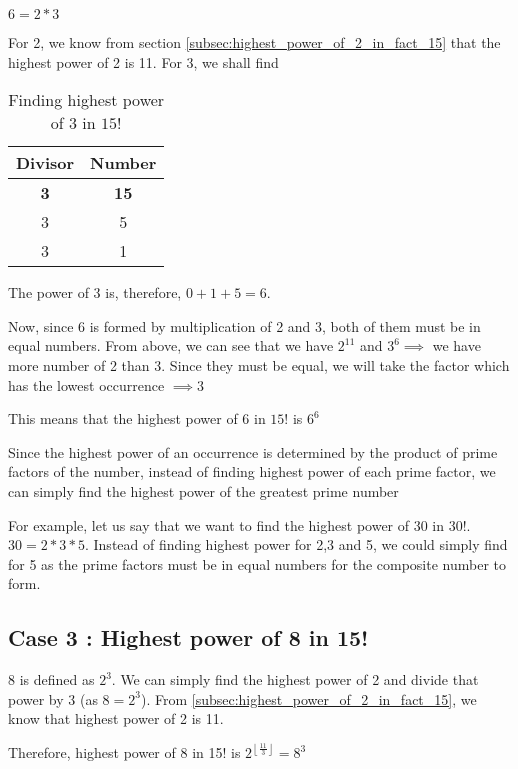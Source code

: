 $6 = 2 * 3$

For 2, we know from section \ref{subsec:highest_power_of_2_in_fact_15} that the highest power of 2 is 11. For 3, we shall find

\begin{table}[ht!]
    \centering
    \begin{tabular}{|| c | c ||}
        \hline
         Divisor & Number  \\
        \hline
         \textbf{3} & \textbf{15} \\
         3 & 5 \\
         3 & 1 \\
        \hline
    \end{tabular}
    \caption{Finding highest power of 3 in $15!$}
\end{table}

The power of 3 is, therefore, $0 + 1 + 5 = 6$.

Now, since 6 is formed by multiplication of 2 and 3, both of them must be in equal numbers. From above, we can see that we have $2^{11}$ and $3^6 \implies$ we have more number of 2 than 3. Since they must be equal, we will take the factor which has the lowest occurrence $\implies 3$

This means that the highest power of 6 in $15!$ is $6^6$

\begin{NOTE}
    Since the highest power of an occurrence is determined by the product of prime factors of the number, instead of finding highest power of each prime factor, we can simply find the highest power of the greatest prime number

    For example, let us say that we want to find the highest power of $30$ in $30!$. $30 = 2 * 3 * 5$. Instead of finding highest power for 2,3 and 5, we could simply find for 5 as the prime factors must be in equal numbers for the composite number to form.
\end{NOTE}


\subsection{Case 3 : Highest power of 8 in 15!}

8 is defined as $2^3$. We can simply find the highest power of 2 and divide that power by 3 (as $8 = 2^3$). From \ref{subsec:highest_power_of_2_in_fact_15}, we know that highest power of 2 is 11. 

Therefore, highest power of 8 in 15! is $2^{\displaystyle{ \left \lfloor \frac{11}{3} \right \rfloor } } = 8^3$


